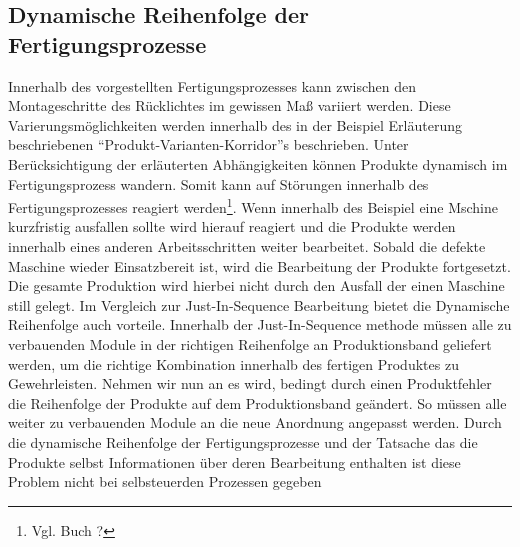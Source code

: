 \subsection{Dynamische Reihenfolge der Fertigungsprozesse}
\label{DynamischeReihenfolge}

Innerhalb des vorgestellten Fertigungsprozesses kann zwischen den Montageschritte des Rücklichtes im gewissen Maß variiert 
werden. Diese Varierungsmöglichkeiten werden innerhalb des in der Beispiel Erläuterung beschriebenen 
“Produkt-Varianten-Korridor”s beschrieben. Unter Berücksichtigung der erläuterten Abhängigkeiten 
können Produkte dynamisch im Fertigungsprozess wandern. Somit kann auf Störungen innerhalb des 
Fertigungsprozesses reagiert werden\footnote{Vgl. Buch ?}. Wenn innerhalb des  Beispiel eine Mschine kurzfristig 
ausfallen sollte wird hierauf reagiert und die Produkte werden innerhalb eines anderen 
Arbeitsschritten weiter bearbeitet. Sobald die defekte Maschine wieder Einsatzbereit ist, 
wird die Bearbeitung der Produkte fortgesetzt. Die gesamte Produktion wird hierbei 
nicht durch den Ausfall der einen Maschine still gelegt. 
Im Vergleich zur Just-In-Sequence Bearbeitung bietet die Dynamische Reihenfolge auch vorteile. 
Innerhalb der Just-In-Sequence methode müssen alle zu verbauenden Module in der richtigen 
Reihenfolge an Produktionsband geliefert werden, um die richtige Kombination innerhalb des 
fertigen Produktes zu Gewehrleisten. Nehmen wir nun an es wird, bedingt durch einen Produktfehler 
die Reihenfolge der Produkte auf dem Produktionsband geändert. So müssen alle weiter zu verbauenden 
Module an die neue Anordnung angepasst werden. 
Durch die dynamische Reihenfolge der Fertigungsprozesse und der Tatsache das die Produkte selbst 
Informationen über deren Bearbeitung enthalten ist diese Problem nicht bei selbsteuerden Prozessen gegeben
